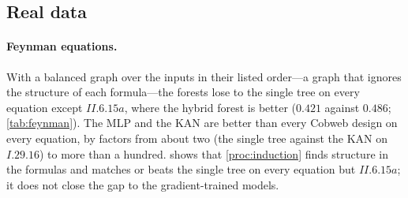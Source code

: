 \documentclass[11pt]{article}
\theoremstyle{definition}
\theoremstyle{remark}
\begin{document}
\subsection{Real data}

\begin{table}[t]
\centering\small
\resizebox{\linewidth}{!}{}
\caption{Feynman equations, $N=4000$: test RMSE$/\mathrm{sd}(f)$, mean of three seeds;
forests use a balanced graph over the inputs in their listed order.}
\label{tab:feynman}
\end{table}

\begin{table}[t]
\centering\small
\resizebox{\linewidth}{!}{}
\caption{California housing: test RMSE of the log median value (three seeds).}
\label{tab:housing}
\end{table}

\begin{table}[t]
\centering\small

\caption{MNIST, accuracy (\%, three seeds).  Forests have one tree per $7\times7$
patch.  ``label'': the patch trees categorize (the Convolutional-Cobweb protocol);
``cross'': they predict the centre pixels of the neighbouring patches; ``act'': they
predict the class and pass its distribution; ``hybrid'': ``act'' plus labels.}
\label{tab:mnist}
\end{table}

\begin{table}[t]
\centering\small

\caption{Next word on OpenWebText from the previous four words (2000-word vocabulary):
top-1 accuracy (\%) / cross-entropy (nats).  An accuracy of 20.9 is the frequency of the
unknown-word token.}
\label{tab:owt}
\end{table}

\paragraph{Feynman equations.}
With a balanced graph over the inputs in their listed order---a graph that ignores the
structure of each formula---the forests lose to the single tree on every equation except
$II.6.15a$, where the hybrid forest is better ($0.421$ against $0.486$; \cref{tab:feynman}).
The MLP and the KAN are better than every Cobweb design on every equation, by factors from
about two (the single tree against the KAN on $I.29.16$) to more than a hundred.
 shows that \cref{proc:induction} finds structure in the formulas and
matches or beats the single tree on every equation but $II.6.15a$; it does not close the
gap to the gradient-trained models.
\end{document}
